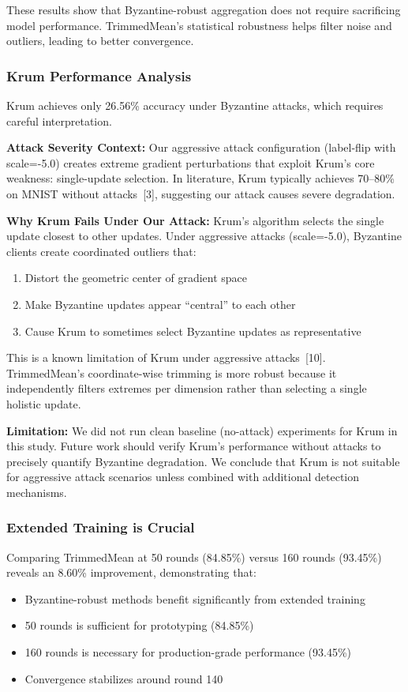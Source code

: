 \documentclass[12pt,a4paper,onecolumn]{article}
\begin{document}
These results show that Byzantine-robust aggregation does not require sacrificing model performance. TrimmedMean's statistical robustness helps filter noise and outliers, leading to better convergence.

\subsubsection{Krum Performance Analysis}

Krum achieves only 26.56\% accuracy under Byzantine attacks, which requires careful interpretation. 

\textbf{Attack Severity Context:} Our aggressive attack configuration (label-flip with scale=-5.0) creates extreme gradient perturbations that exploit Krum's core weakness: single-update selection. In literature, Krum typically achieves 70--80\% on MNIST without attacks~[3], suggesting our attack causes severe degradation.

\textbf{Why Krum Fails Under Our Attack:} Krum's algorithm selects the single update closest to other updates. Under aggressive attacks (scale=-5.0), Byzantine clients create coordinated outliers that:
\begin{enumerate}
    \item Distort the geometric center of gradient space
    \item Make Byzantine updates appear ``central'' to each other
    \item Cause Krum to sometimes select Byzantine updates as representative
\end{enumerate}

This is a known limitation of Krum under aggressive attacks~[10]. TrimmedMean's coordinate-wise trimming is more robust because it independently filters extremes per dimension rather than selecting a single holistic update. 

\textbf{Limitation:} We did not run clean baseline (no-attack) experiments for Krum in this study. Future work should verify Krum's performance without attacks to precisely quantify Byzantine degradation. We conclude that Krum is not suitable for aggressive attack scenarios unless combined with additional detection mechanisms.

\subsubsection{Extended Training is Crucial}

Comparing TrimmedMean at 50 rounds (84.85\%) versus 160 rounds (93.45\%) reveals an 8.60\% improvement, demonstrating that:
\begin{itemize}
    \item Byzantine-robust methods benefit significantly from extended training
    \item 50 rounds is sufficient for prototyping (84.85\%)
    \item 160 rounds is necessary for production-grade performance (93.45\%)
    \item Convergence stabilizes around round 140
\end{itemize}
\end{document}
